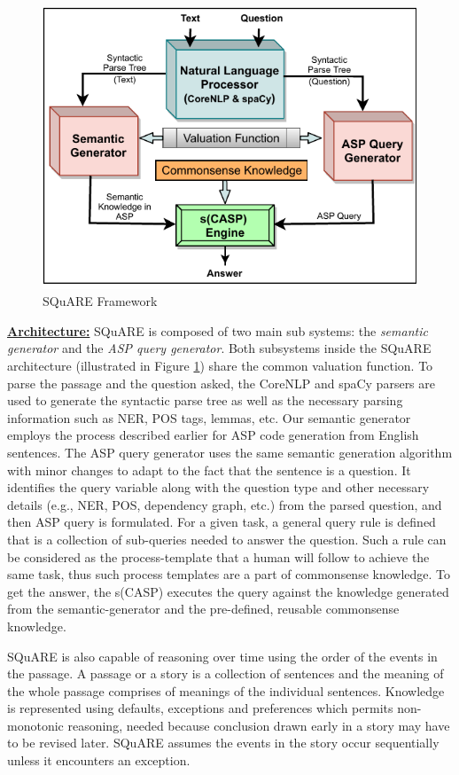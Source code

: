 \documentclass[letterpaper]{article}
\begin{document}
\begin{figure}[h]
\centering
\includegraphics[scale = 0.7]{general_framework}
\caption{ SQuARE Framework }
\label{fig:genral_framework}
\end{figure}
\noindent\textbf{\underline{Architecture:}}
SQuARE is composed of two main sub systems: the \textit{semantic generator} and the \textit{ASP query generator}. Both subsystems inside the SQuARE architecture (illustrated in Figure \ref{fig:genral_framework}) share the common valuation function. To parse the passage and the question asked, the CoreNLP and spaCy parsers are used to generate the syntactic parse tree as well as the necessary parsing information such as NER, POS tags, lemmas, etc. Our semantic generator employs the process described earlier for ASP code generation from English sentences. The ASP query generator uses the same semantic generation algorithm with minor changes to adapt to the fact that the sentence is a question. It identifies the query variable along with the question type and other necessary details (e.g., NER, POS, dependency graph, etc.) from the parsed question, and then ASP query is formulated. For a given task, a  general query rule is defined that is a collection of sub-queries needed to answer the question. Such a rule can be considered as the process-template that a human will follow to achieve the same task, thus such process templates are a part of commonsense knowledge. To get the answer, the s(CASP) executes the query against the knowledge generated from the semantic-generator and the pre-defined, reusable commonsense knowledge.

SQuARE is also capable of reasoning over time using the order of the events in the passage. A passage or a story is a collection of sentences and the meaning of the whole passage comprises of meanings of the individual sentences. Knowledge is represented using defaults, exceptions and preferences which permits non-monotonic reasoning, needed because conclusion drawn early in a story may have to be revised later. SQuARE assumes the events in the story occur sequentially unless it encounters an exception.
\end{document}
